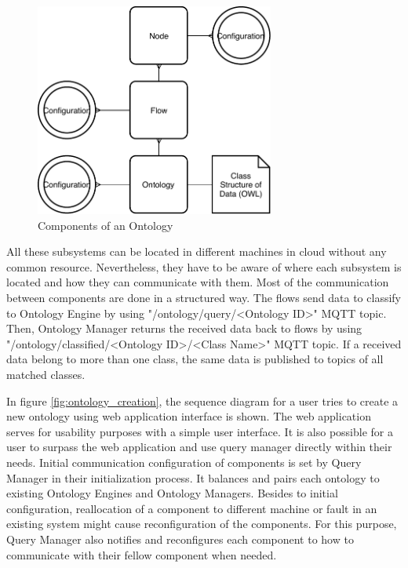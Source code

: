 \begin{figure}[H]
  \centering
  \includegraphics[width=0.7\textwidth,height=\textheight,keepaspectratio]{figures/components_of_ontology.pdf}
  \caption[Ontology Components]{Components of an Ontology}\label{fig:ontology_components}
\end{figure}

All these subsystems can be located in different machines in cloud without any common resource. Nevertheless, they have to be aware of where each subsystem is located and how they can communicate with them. Most of the communication between components are done in a structured way. The flows send data to classify to Ontology Engine by using "/ontology/query/<Ontology ID>" MQTT topic. Then, Ontology Manager returns the received data back to flows by using "/ontology/classified/<Ontology ID>/<Class Name>" MQTT topic. If a received data belong to more than one class, the same data is published to topics of all matched classes.

In figure \ref{fig:ontology_creation}, the sequence diagram for a user tries to create a new ontology using web application interface is shown. The web application serves for usability purposes with a simple user interface. It is also possible for a user to surpass the web application and use query manager directly within their needs. Initial communication configuration of components is set by Query Manager in their initialization process. It balances and pairs each ontology to existing Ontology Engines and Ontology Managers.  Besides to initial configuration, reallocation of a component to different machine or fault in an existing system might cause reconfiguration of the components. For this purpose, Query Manager also notifies and reconfigures each component to how to communicate with their fellow component when needed. 

